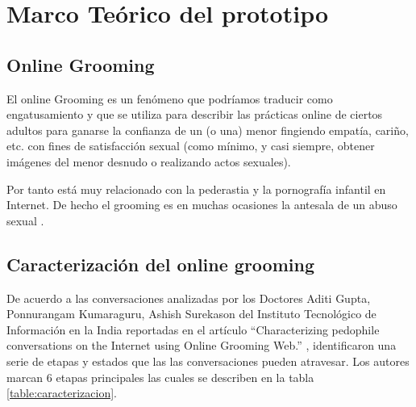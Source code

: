 \section{Marco Te\'orico del prototipo}

\subsection{Online Grooming}
El online Grooming es un fen\'omeno que podr\'iamos traducir como engatusamiento y que se utiliza para describir las pr\'acticas online de ciertos adultos para ganarse la confianza de un (o una) menor fingiendo empat\'ia, cariño, etc. con fines de satisfacción sexual (como m\'inimo, y casi siempre, obtener im\'agenes del menor desnudo o realizando actos sexuales).

Por tanto est\'a muy relacionado con la pederastia y la pornograf\'ia infantil en Internet. De hecho el grooming es en muchas ocasiones la antesala de un abuso sexual \cite{grooming}.

\subsection{Caracterización del online grooming}
De acuerdo a las conversaciones analizadas por los Doctores Aditi Gupta, Ponnurangam Kumaraguru, Ashish Surekason del Instituto Tecnol\'ogico de Informaci\'on en la India reportadas en el art\'iculo  ``Characterizing pedophile conversations on the Internet using Online Grooming Web.'' \cite{articulo}, identificaron una serie de etapas y estados que las  las conversaciones pueden atravesar. Los autores marcan 6 etapas principales las cuales se describen en la tabla \ref{table:caracterizacion}.


